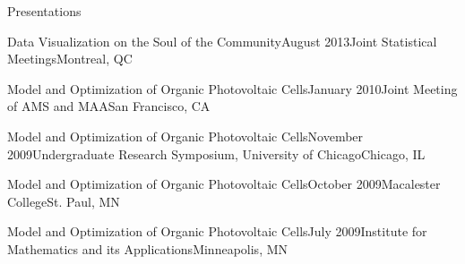 \documentclass{resume} %
\begin{document}
\begin{rSection}{Presentations}

\begin{sSubsection}{Data Visualization on the Soul of the Community}{}{August 2013}{Joint Statistical Meetings}{Montreal, QC}
\end{sSubsection}

\begin{sSubsection}{Model and Optimization of Organic Photovoltaic Cells}{}{January 2010}{Joint Meeting of AMS and MAA}{San Francisco, CA}
\end{sSubsection}

\begin{sSubsection}{Model and Optimization of Organic Photovoltaic Cells}{}{November 2009}{Undergraduate Research Symposium, University of Chicago}{Chicago, IL}
\end{sSubsection}

\begin{sSubsection}{Model and Optimization of Organic Photovoltaic Cells}{}{October 2009}{Macalester College}{St. Paul, MN}
\end{sSubsection}

\begin{sSubsection}{Model and Optimization of Organic Photovoltaic Cells}{}{July 2009}{Institute for Mathematics and its Applications}{Minneapolis, MN}
\end{sSubsection}
\end{rSection}

\end{document}
